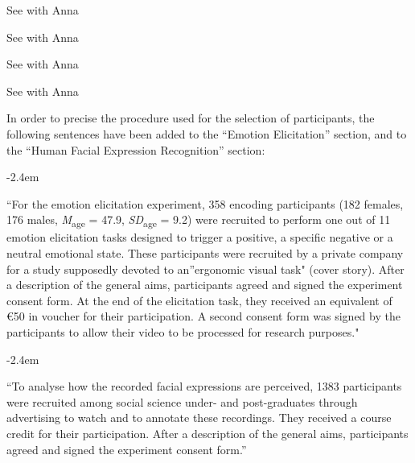 \documentclass[]{article}
\renewenvironment{quote}{\begin{fquote}\advance\leftmargini -2.4em\begin{oldquote}}{\end{oldquote}\end{fquote}}
\newenvironment{fquote}
  {\def\FrameCommand{
	\fboxsep=0.6em %
	\fcolorbox{black}{white}}%
    \MakeFramed {\advance\hsize-2\width \FrameRestore}
    \begin{minipage}{\linewidth}
  }
  {\end{minipage}\endMakeFramed}
\begin{document}
See with Anna


See with Anna


See with Anna


See with Anna


In order to precise the procedure used for the selection of participants, the following sentences have been added to the ``Emotion Elicitation'' section, and to the ``Human Facial Expression Recognition'' section:

\begin{quote}
``For the emotion elicitation experiment, 358 encoding participants (182 females, 176 males, \emph{M}\textsubscript{age} = 47.9, \emph{SD}\textsubscript{age} = 9.2) were recruited to perform one out of 11 emotion elicitation tasks designed to trigger a positive, a specific negative or a neutral emotional state. These participants were recruited by a private company for a study supposedly devoted to an''ergonomic visual task" (cover story). After a description of the general aims, participants agreed and signed the experiment consent form. At the end of the elicitation task, they received an equivalent of €50 in voucher for their participation. A second consent form was signed by the participants to allow their video to be processed for research purposes."
\end{quote}

\begin{quote}
``To analyse how the recorded facial expressions are perceived, 1383 participants were recruited among social science under- and post-graduates through advertising to watch and to annotate these recordings. They received a course credit for their participation. After a description of the general aims, participants agreed and signed the experiment consent form.''
\end{quote}

\end{document}
